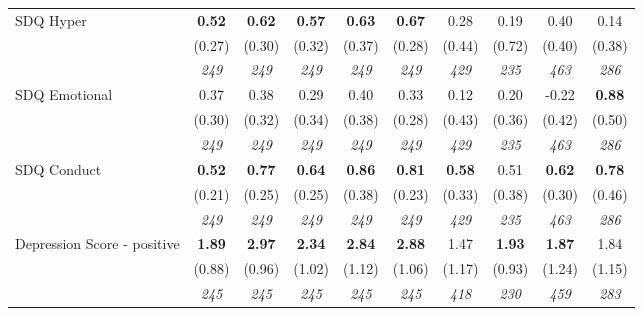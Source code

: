 \begin{tabular}{l c c c c c c c c c}
SDQ Hyper & \textbf{ 0.52 } & \textbf{ 0.62 } & \textbf{ 0.57 } & \textbf{0.63} & \textbf{0.67} & 0.28 & 0.19 & 0.40 & 0.14 \\
& (0.27) & (0.30) & (0.32) & (0.37) & (0.28) & (0.44) & (0.72) & (0.40) & (0.38) \\
& \textit{ 249 } & \textit{ 249 } & \textit{ 249 } & \textit{ 249 } & \textit{ 249 } & \textit{ 429 } & \textit{ 235 } & \textit{ 463 } & \textit{ 286 } \\
SDQ Emotional & 0.37 & 0.38 & 0.29 & 0.40 & 0.33 & 0.12 & 0.20 & -0.22 & \textbf{0.88} \\
& (0.30) & (0.32) & (0.34) & (0.38) & (0.28) & (0.43) & (0.36) & (0.42) & (0.50) \\
& \textit{ 249 } & \textit{ 249 } & \textit{ 249 } & \textit{ 249 } & \textit{ 249 } & \textit{ 429 } & \textit{ 235 } & \textit{ 463 } & \textit{ 286 } \\
SDQ Conduct & \textbf{ 0.52 } & \textbf{ 0.77 } & \textbf{ 0.64 } & \textbf{0.86} & \textbf{0.81} & \textbf{ 0.58 } & 0.51 & \textbf{ 0.62 } & \textbf{0.78} \\
& (0.21) & (0.25) & (0.25) & (0.38) & (0.23) & (0.33) & (0.38) & (0.30) & (0.46) \\
& \textit{ 249 } & \textit{ 249 } & \textit{ 249 } & \textit{ 249 } & \textit{ 249 } & \textit{ 429 } & \textit{ 235 } & \textit{ 463 } & \textit{ 286 } \\
Depression Score - positive & \textbf{ 1.89 } & \textbf{ 2.97 } & \textbf{ 2.34 } & \textbf{2.84} & \textbf{2.88} & 1.47 & \textbf{1.93} & \textbf{ 1.87 } & 1.84 \\
& (0.88) & (0.96) & (1.02) & (1.12) & (1.06) & (1.17) & (0.93) & (1.24) & (1.15) \\
& \textit{ 245 } & \textit{ 245 } & \textit{ 245 } & \textit{ 245 } & \textit{ 245 } & \textit{ 418 } & \textit{ 230 } & \textit{ 459 } & \textit{ 283 } \\
\bottomrule
\end{tabular}
